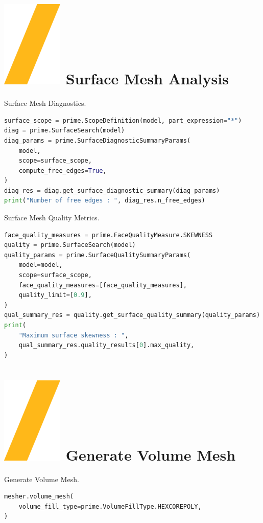 \documentclass[9pt,landscape]{article}
\begin{document}
\begin{multicols}{3}
\section{\includegraphics[height=\fontcharht\font`\S]{slash.png} Surface Mesh Analysis}
Surface Mesh Diagnostics. 
\begin{lstlisting}[language=Python]
surface_scope = prime.ScopeDefinition(model, part_expression="*")
diag = prime.SurfaceSearch(model)
diag_params = prime.SurfaceDiagnosticSummaryParams(
    model,
    scope=surface_scope,
    compute_free_edges=True,
)
diag_res = diag.get_surface_diagnostic_summary(diag_params)
print("Number of free edges : ", diag_res.n_free_edges)
\end{lstlisting}

Surface Mesh Quality Metrics.
\begin{lstlisting}[language=Python]
face_quality_measures = prime.FaceQualityMeasure.SKEWNESS
quality = prime.SurfaceSearch(model)
quality_params = prime.SurfaceQualitySummaryParams(
    model=model,
    scope=surface_scope,
    face_quality_measures=[face_quality_measures],
    quality_limit=[0.9],
)
qual_summary_res = quality.get_surface_quality_summary(quality_params)
print(
    "Maximum surface skewness : ",
    qual_summary_res.quality_results[0].max_quality,
)
\end{lstlisting}

\section{\includegraphics[height=\fontcharht\font`\S]{slash.png} Generate Volume Mesh}
Generate Volume Mesh.
\begin{lstlisting}[language=Python]
mesher.volume_mesh(
    volume_fill_type=prime.VolumeFillType.HEXCOREPOLY,
)
\end{lstlisting}


\end{multicols}
\end{document}
